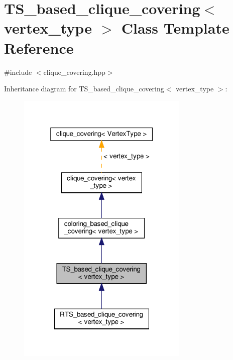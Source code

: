 \hypertarget{classTS__based__clique__covering}{}\section{T\+S\+\_\+based\+\_\+clique\+\_\+covering$<$ vertex\+\_\+type $>$ Class Template Reference}
\label{classTS__based__clique__covering}


{\ttfamily \#include $<$clique\+\_\+covering.\+hpp$>$}



Inheritance diagram for T\+S\+\_\+based\+\_\+clique\+\_\+covering$<$ vertex\+\_\+type $>$\+:
\nopagebreak
\begin{figure}[H]
\begin{center}
\leavevmode
\includegraphics[width=232pt]{d6/dde/classTS__based__clique__covering__inherit__graph}
\end{center}
\end{figure}


